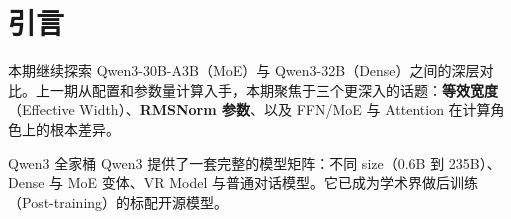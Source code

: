 \section{引言}

本期继续探索 Qwen3-30B-A3B（MoE）与 Qwen3-32B（Dense）之间的深层对比。上一期从配置和参数量计算入手，本期聚焦于三个更深入的话题：\textbf{等效宽度}（Effective Width）、\textbf{RMSNorm 参数}、以及 FFN/MoE 与 Attention 在计算角色上的根本差异。

\begin{knowledgebox}{Qwen3 全家桶}
Qwen3 提供了一套完整的模型矩阵：不同 size（0.6B 到 235B）、Dense 与 MoE 变体、VR Model 与普通对话模型。它已成为学术界做后训练（Post-training）的标配开源模型。
\end{knowledgebox}

